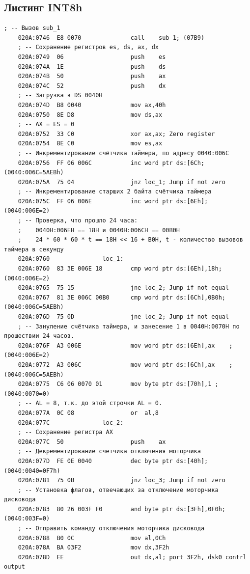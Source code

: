 \documentclass[a4paper,12pt]{article}
\begin{document}
\subsection{Листинг INT8h} 
\begin{lstlisting}[style={asm}]
	; -- Вызов sub_1
	020A:0746  E8 0070              call    sub_1; (07B9) 
	; -- Сохранение регистров es, ds, ax, dx
	020A:0749  06                   push    es
	020A:074A  1E                   push    ds
	020A:074B  50                   push    ax
	020A:074C  52                   push    dx
	; -- Загрузка в DS 0040H
	020A:074D  B8 0040              mov ax,40h
	020A:0750  8E D8                mov ds,ax
	; -- AX = ES = 0
	020A:0752  33 C0                xor ax,ax; Zero register
	020A:0754  8E C0                mov es,ax
	; -- Инкрементирование счётчика таймера, по адресу 0040:006C
	020A:0756  FF 06 006C           inc word ptr ds:[6Ch; (0040:006C=5AEBh)
	020A:075A  75 04                jnz loc_1; Jump if not zero
	; -- Инкрементирование старших 2 байта счётчика таймера
	020A:075C  FF 06 006E           inc word ptr ds:[6Eh]; (0040:006E=2)
	; -- Проверка, что прошло 24 часа:
	;    0040H:006EH == 18H и 0040H:006CH == 00B0H
	;    24 * 60 * 60 * t == 18H << 16 + B0H, t - количество вызовов таймера в секунду
	020A:0760               loc_1:
	020A:0760  83 3E 006E 18        cmp word ptr ds:[6Eh],18h; (0040:006E=2)
	020A:0765  75 15                jne loc_2; Jump if not equal
	020A:0767  81 3E 006C 00B0      cmp word ptr ds:[6Ch],0B0h; (0040:006C=5AEBh)
	020A:076D  75 0D                jne loc_2; Jump if not equal
	; -- Зануление счётчика таймера, и занесение 1 в 0040H:0070H по прошествии 24 часов.
	020A:076F  A3 006E              mov word ptr ds:[6Eh],ax    ; (0040:006E=2)
	020A:0772  A3 006C              mov word ptr ds:[6Ch],ax    ; (0040:006C=5AEBh)
	020A:0775  C6 06 0070 01        mov byte ptr ds:[70h],1 ; (0040:0070=0)
	; -- AL = 8, т.к. до этой строчки AL = 0.
	020A:077A  0C 08                or  al,8
	020A:077C               loc_2:
	; -- Сохранение регистра AX
	020A:077C  50                   push    ax
	; -- Декрементирование счетчика отключения моторчика
	020A:077D  FE 0E 0040           dec byte ptr ds:[40h]; (0040:0040=0F7h)
	020A:0781  75 0B                jnz loc_3; Jump if not zero
	; -- Установка флагов, отвечающих за отключение моторчика дисковода
	020A:0783  80 26 003F F0        and byte ptr ds:[3Fh],0F0h; (0040:003F=0)
	; -- Отправить команду отключения моторчика дисковода
	020A:0788  B0 0C                mov al,0Ch
	020A:078A  BA 03F2              mov dx,3F2h
	020A:078D  EE                   out dx,al; port 3F2h, dsk0 contrl output

\end{lstlisting}
\end{document}
